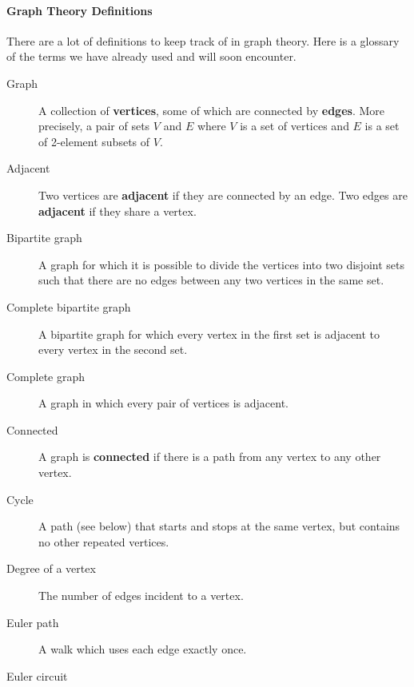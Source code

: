 \documentclass[11pt,]{book}
\newcommand{\terminology}[1]{\textbf{#1}}
\theoremstyle{ptxplainnotitle}
\theoremstyle{ptxplaintitle}
\theoremstyle{ptxdefinitionnotitle}
\theoremstyle{ptxdefinitiontitle}
\theoremstyle{ptxdefinitionnotitle}
\theoremstyle{ptxdefinitiontitle}
\theoremstyle{ptxdefinitionnotitle}
\theoremstyle{ptxdefinitiontitle}
\theoremstyle{ptxdefinitiontitlenonumber}
\theoremstyle{ptxdefinitiontitlenonumber}
\numberwithin{equation}{chapter}
\begin{document}
\paragraph[{Graph Theory Definitions}]{Graph Theory Definitions}\hypertarget{paragraphs-7}{}
\hypertarget{p-2533}{}%
There are a lot of definitions to keep track of in graph theory.  Here is a glossary of the terms we have already used and will soon encounter. \leavevmode%
\begin{description}
\item[{Graph}]\hypertarget{li-1172}{}\hypertarget{p-2534}{}%
 A collection of \terminology{vertices}, some of which are connected by \terminology{edges}. More precisely, a pair of sets \(V\) and \(E\) where \(V\) is a set of vertices and \(E\) is a set of 2-element subsets of \(V\).%
\item[{Adjacent}]\hypertarget{li-1173}{}\hypertarget{p-2535}{}%
 Two vertices are \terminology{adjacent} if they are connected by an edge. Two edges are \terminology{adjacent} if they share a vertex.%
\item[{Bipartite graph}]\hypertarget{li-1174}{}\hypertarget{p-2536}{}%
 A graph for which it is possible to divide the vertices into two disjoint sets such that there are no edges between any two vertices in the same set.%
\item[{Complete bipartite graph}]\hypertarget{li-1175}{}\hypertarget{p-2537}{}%
A bipartite graph for which every vertex in the first set is adjacent to every vertex in the second set.%
\item[{Complete graph}]\hypertarget{li-1176}{}\hypertarget{p-2538}{}%
 A graph in which every pair of vertices is adjacent.%
\item[{Connected}]\hypertarget{li-1177}{}\hypertarget{p-2539}{}%
 A graph is \terminology{connected} if there is a path from any vertex to any other vertex.%
\item[{Cycle}]\hypertarget{li-1178}{}\hypertarget{p-2540}{}%
 A path (see below) that starts and stops at the same vertex, but contains no other repeated vertices.%
\item[{Degree of a vertex}]\hypertarget{li-1179}{}\hypertarget{p-2541}{}%
 The number of edges incident to a vertex.%
\item[{Euler path}]\hypertarget{li-1180}{}\hypertarget{p-2542}{}%
A walk which uses each edge exactly once.%
\item[{Euler circuit}]\hypertarget{li-1181}{}\hypertarget{p-2543}{}%

\end{description}
\end{document}

